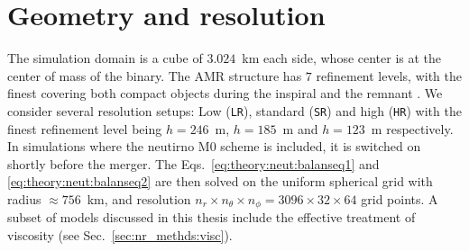 \section{Geometry and resolution}

The simulation domain is a cube of $3.024$~km each side, 
whose center is at the center of mass of the binary.
The \ac{AMR} structure has $7$ refinement levels, with the finest 
covering both compact objects during the inspiral and the remnant \pmerg{}.
%
We consider several resolution setups: Low (\texttt{LR}), 
standard (\texttt{SR}) and high (\texttt{HR}) with the finest 
refinement level being 
$h=246$~m, $h=185$~m and $h=123$~m respectively.
%
In simulations where the neutirno M0 scheme is included,
it is switched on shortly before the merger. 
The Eqs.~\eqref{eq:theory:neut:balanseq1} and \eqref{eq:theory:neut:balanseq2}
are then solved on the uniform spherical grid with radius ${\approx}756$~km, 
and resolution $n_r\times n_{\theta}\times n_{\phi} = 3096 \times 32 \times 64$
grid points.
%
A subset of models discussed in this thesis include the effective treatment of viscosity
(see Sec.~\ref{sec:nr_methds:visc}). 



%
%
